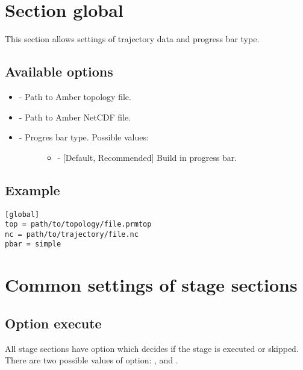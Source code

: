 \documentclass[a4paper,10pt,english]{sphinxmanual}
\begin{document}
\section{Section \textbf{global}}
\label{valve/valve_config:section-global}
This section allows settings of trajectory data and progress bar type.


\subsection{Available options}
\label{valve/valve_config:available-options}\begin{itemize}
\item {} 
 - Path to Amber topology file.

\item {} 
 - Path to Amber NetCDF file.

\item {} \begin{description}
\item[{ - Progres bar type. Possible values:}] \leavevmode\begin{itemize}
\item {} 
 - {[}Default, Recommended{]} Build in progress bar.

\end{itemize}

\end{description}

\end{itemize}


\subsection{Example}
\label{valve/valve_config:example}
\begin{Verbatim}[commandchars=\\\{\}]
[global]
top = path/to/topology/file.prmtop
nc = path/to/trajectory/file.nc
pbar = simple
\end{Verbatim}


\section{Common settings of stage sections}
\label{valve/valve_config:common-settings-of-stage-sections}

\subsection{Option \textbf{execute}}
\label{valve/valve_config:option-execute}
All stage sections have  option which decides if the stage is executed or skipped. There are two possible values of  option: , and .
\end{document}
